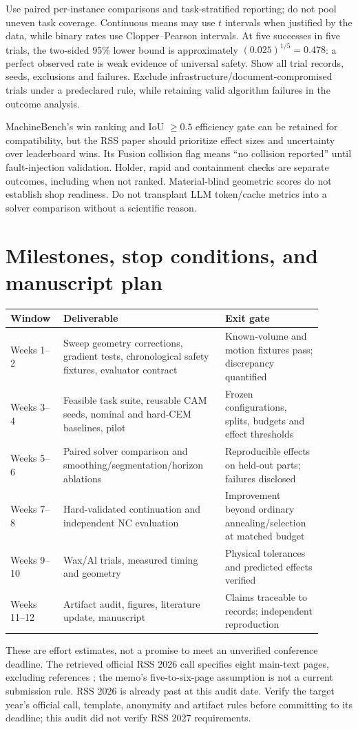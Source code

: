 \documentclass[11pt]{article}
\begin{document}
Use paired per-instance comparisons and task-stratified reporting; do not pool
uneven task coverage. Continuous means may use $t$ intervals when justified by
the data, while binary rates use Clopper--Pearson intervals. At five successes
in five trials, the two-sided 95\% lower bound is approximately
$(0.025)^{1/5}=0.478$: a perfect observed rate is weak evidence of universal
safety. Show all trial records, seeds, exclusions and failures. Exclude
infrastructure/document-compromised trials under a predeclared rule, while
retaining valid algorithm failures in the outcome analysis.

MachineBench's win ranking and IoU $\geq0.5$ efficiency gate can be retained for
compatibility, but the RSS paper should prioritize effect sizes and uncertainty
over leaderboard wins. Its Fusion collision flag means ``no collision reported''
until fault-injection validation. Holder, rapid and containment checks are
separate outcomes, including when not ranked. Material-blind geometric scores
do not establish shop readiness. Do not transplant LLM token/cache metrics into
a solver comparison without a scientific reason.

\section{Milestones, stop conditions, and manuscript plan}
\begin{longtable}{p{0.13\linewidth}p{0.48\linewidth}p{0.29\linewidth}}
\toprule Window & Deliverable & Exit gate\\\midrule
Weeks 1--2 & Sweep geometry corrections, gradient tests, chronological safety fixtures, evaluator contract & Known-volume and motion fixtures pass; discrepancy quantified\\
Weeks 3--4 & Feasible task suite, reusable CAM seeds, nominal and hard-CEM baselines, pilot & Frozen configurations, splits, budgets and effect thresholds\\
Weeks 5--6 & Paired solver comparison and smoothing/segmentation/horizon ablations & Reproducible effects on held-out parts; failures disclosed\\
Weeks 7--8 & Hard-validated continuation and independent NC evaluation & Improvement beyond ordinary annealing/selection at matched budget\\
Weeks 9--10 & Wax/Al trials, measured timing and geometry & Physical tolerances and predicted effects verified\\
Weeks 11--12 & Artifact audit, figures, literature update, manuscript & Claims traceable to records; independent reproduction\\\bottomrule
\end{longtable}
These are effort estimates, not a promise to meet an unverified conference
deadline. The retrieved official RSS 2026 call specifies eight main-text pages,
excluding references \cite{rss}; the memo's five-to-six-page assumption is not
a current submission rule. RSS 2026 is already past at this audit date. Verify
the target year's official call, template, anonymity and artifact rules before
committing to its deadline; this audit did not verify RSS 2027 requirements.
\end{document}
